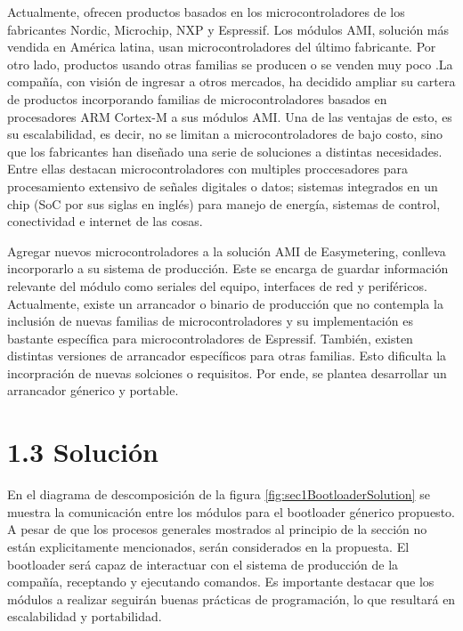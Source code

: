 \documentclass[
11pt, %
]{charter}
\begin{document}
Actualmente, ofrecen productos basados en los microcontroladores de los fabricantes Nordic, Microchip, NXP y Espressif. Los módulos AMI, solución más vendida en América latina, usan microcontroladores del último fabricante. Por otro lado, productos usando otras familias se producen o se venden muy poco  .La compañía, con visión de ingresar a otros mercados, ha decidido ampliar su cartera de productos incorporando familias de microcontroladores basados en procesadores ARM Cortex-M a sus módulos AMI. Una de las ventajas de esto, es su escalabilidad, es decir, no se limitan a microcontroladores de bajo costo, sino que los fabricantes han diseñado una serie de soluciones a distintas necesidades. Entre ellas destacan microcontroladores con multiples proccesadores para procesamiento extensivo de señales digitales o datos; sistemas integrados en un chip (SoC por sus siglas en inglés) para manejo de energía, sistemas de control, conectividad e internet de las cosas.

Agregar nuevos microcontroladores a la solución AMI de Easymetering, conlleva incorporarlo a su sistema de producción. Este se encarga de guardar información relevante del módulo como seriales del equipo, interfaces de red y periféricos. Actualmente, existe un arrancador o binario de producción que no contempla la inclusión de nuevas familias de microcontroladores y su implementación es bastante específica para microcontroladores de Espressif. También, existen distintas versiones de arrancador específicos para otras familias. Esto dificulta la incorpración de nuevas solciones o requisitos.  Por ende, se plantea desarrollar un arrancador génerico y portable.

\section{1.3 Solución}
\label{sec:s1Solución}

En el diagrama de descomposición de la figura \ref{fig:sec1BootloaderSolution} se muestra la comunicación entre los módulos para el bootloader génerico propuesto. A pesar de que los procesos generales mostrados al principio de la sección no están explicitamente mencionados, serán considerados en la propuesta. El bootloader será capaz de interactuar con el sistema de producción de la compañía, receptando y ejecutando comandos. Es importante destacar que los módulos a realizar seguirán buenas prácticas de programación, lo que resultará en escalabilidad y portabilidad. 
\end{document}

